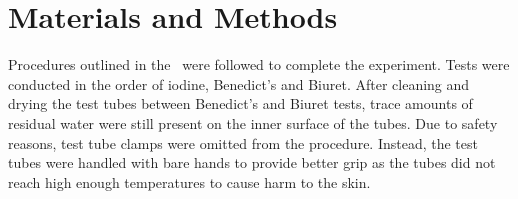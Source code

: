 \section*{Materials and Methods}
Procedures outlined in the~\textcite[p. 16--24]{LM2023} were followed to complete the experiment. 
Tests were conducted in the order of iodine, Benedict's and Biuret. 
After cleaning and drying the test tubes between Benedict's and Biuret tests, trace amounts of residual water were still present on the inner surface of the tubes.
Due to safety reasons, test tube clamps were omitted from the procedure. Instead, the test tubes were handled with bare hands to provide better grip as the tubes did not reach high enough temperatures to cause harm to the skin.